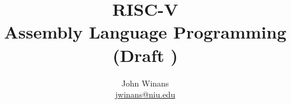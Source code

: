 \documentclass[oneside,letterpaper]{book}
\begin{document}

\newlength{\fullwidth}
\setlength{\fullwidth}{\the\textwidth}
\addtolength{\fullwidth}{\the\marginparsep}
\addtolength{\fullwidth}{\the\marginparwidth}

\frontmatter

\title{RISC-V\\Assembly Language Programming\\{\normalsize (Draft \GitRevision{})}}
\author{John Winans\\ \href{mailto:jwinans@niu.edu}{\sf jwinans@niu.edu}}

\maketitle


\tableofcontents

\setlength{\parskip}{10pt}


\mainmatter

%










%
%


\appendix

%




\backmatter


\nocite{*}  %
%


\glsaddall
\printnoidxglossaries


{}
\printindex


\end{document}
